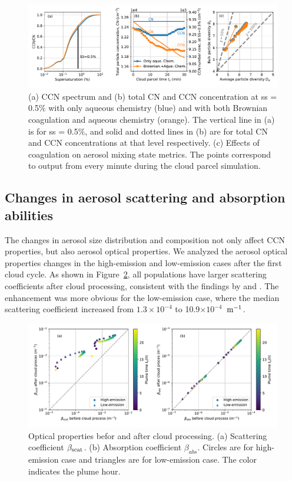 \documentclass[edeposit,fullpage]{uiucthesis2009}
\makeatletter
\DeclareRobustCommand*\unit[1]
 {\ensuremath{%
   {\thinmuskip3mu\relax
    \def\mu{\text{\textmu}}\def~{\,}%
    \ifx\f@series\testbx\mathbf{#1}\else\mathrm{#1}\fi}}}
\makeatother
\begin{document}
\begin{figure}
    \centering
    \includegraphics[scale=0.5]{chap3_figs/fig13.pdf}
    \caption{(a) CCN spectrum and (b) total CN and CCN
      concentration at ss = 0.5$\%$ with only aqueous chemistry 
      (blue) and with both Brownian coagulation and aqueous chemistry
      (orange). The vertical line in (a) is for ss = 0.5$\%$, and
      solid and dotted lines in (b) are for total CN and CCN
      concentrations at that level respectively.  (c) Effects of
      coagulation on aerosol mixing state metrics. The points
      correspond to output from every minute during the cloud parcel
      simulation.}
    \label{fig:coag_ccn_chi}
\end{figure}

\subsection{Changes in aerosol scattering and absorption abilities} 
\label{sec:aq-opt}
The changes in aerosol size distribution and composition not only
affect CCN properties, but also aerosol optical properties.  We
analyzed the aerosol optical properties changes in the high-emission
and low-emission cases after the first cloud cycle. As shown in
Figure~\ref{fig:cloud-opt}, all populations have larger scattering
coefficients after cloud processing, consistent with the findings by
\citet{yuskiewicz1999effects} and
\citet{romakkaniemi2006influence}. The enhancement was more obvious
for the low-emission case, where the median scattering coefficient
increased from $1.3\times10^{-4}$ to 10.9$\times 10^{-4}$~\unit{m^{-1}}.

\begin{figure}[H]
    \centering
    \includegraphics[scale=0.5]{chap3_figs/fig14.pdf}
    \caption{Optical properties befor and after cloud processing. (a)
      Scattering coefficient $\beta_{\rm scat}$. (b) Absorption
      coefficient $\beta_{abs}$. Circles are for high-emission case and
      triangles are for low-emission case. The color indicates the plume
      hour. }
    \label{fig:cloud-opt}
\end{figure}
\end{document}
